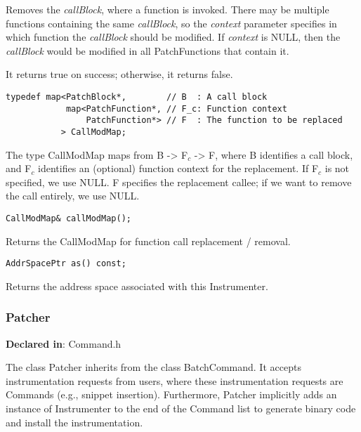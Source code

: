 Removes the \emph{callBlock}, where a function is invoked. There may be multiple
functions containing the same \emph{callBlock}, so the \emph{context} parameter specifies
in which function the \emph{callBlock} should be modified. If \emph{context} is NULL, then
the \emph{callBlock} would be modified in all PatchFunctions that contain it.

It returns true on success; otherwise, it returns false.


\begin{verbatim}
typedef map<PatchBlock*,        // B  : A call block
            map<PatchFunction*, // F_c: Function context
                PatchFunction*> // F  : The function to be replaced
           > CallModMap;

\end{verbatim}



The type CallModMap maps from B -> F$_c$ -> F, where B identifies a call block,
and F$_c$ identifies an (optional) function context for the replacement. If F$_c$ is
not specified, we use NULL. F specifies the replacement callee; if we want to
remove the call entirely, we use NULL.


\begin{verbatim}
CallModMap& callModMap();

\end{verbatim}



Returns the CallModMap for function call replacement / removal.


\begin{verbatim}
AddrSpacePtr as() const;

\end{verbatim}



Returns the address space associated with this Instrumenter.

\subsubsection{Patcher}
\label{sec-3.2.6}

\textbf{Declared in}: Command.h

The class Patcher inherits from the class BatchCommand. It accepts
instrumentation requests from users, where these instrumentation requests are
Commands (e.g., snippet insertion). Furthermore, Patcher implicitly adds an
instance of Instrumenter to the end of the Command list to generate binary code
and install the instrumentation.



